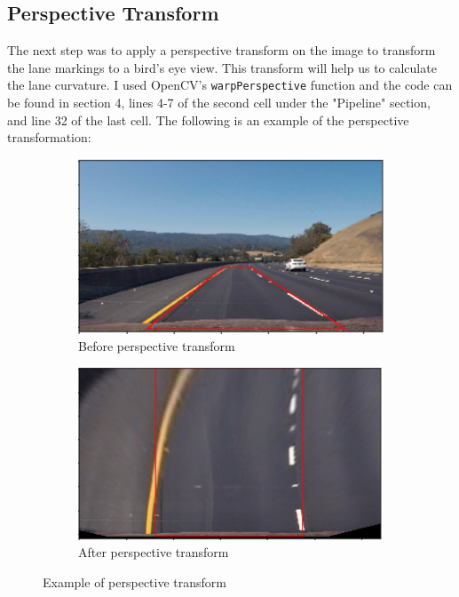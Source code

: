 \documentclass[12pt]{article}
\begin{document}
\subsection{Perspective Transform}
The next step was to apply a perspective transform on the image to transform the lane markings to a bird's eye view. This transform will help us to calculate the lane curvature. I used OpenCV's \texttt{warpPerspective} function and the code can be found in section 4, lines 4-7 of the second cell under the "Pipeline" section, and line 32 of the last cell. The following is an example of the perspective transformation:

\begin{figure}[h]
\centering
\begin{subfigure}{.5\textwidth}
  \centering
  \includegraphics[width=1\linewidth]{src_pts.png}
  \caption{Before perspective transform}
\end{subfigure}%
\begin{subfigure}{.5\textwidth}
  \centering
  \includegraphics[width=1\linewidth]{warped_src_pts.png}
  \caption{After perspective transform}
  \label{fig:perspective}
\end{subfigure}
\caption{Example of perspective transform}
\end{figure}
\end{document}

